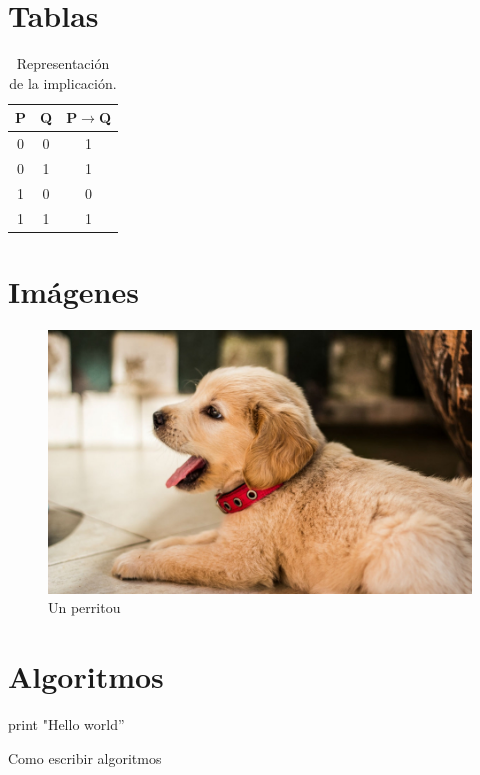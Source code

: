 \documentclass[11pt]{article} %
\begin{document}
\section{Tablas}

\begin{table}[H]
  \centering
  \begin{tabular}{| c | c || c|}
    \hline
    P & Q  & P$\rightarrow$Q \\ \hline
    0 & 0 & 1 \\ \hline
    0 & 1 & 1 \\ \hline          
    1 & 0 & 0 \\ \hline
    1 & 1 & 1 \\ \hline
  \end{tabular}
  \caption{Representación de la implicación.}
  \label{tabla:implicación}
\end{table}

\section{Imágenes}

\begin{figure}[H] %
  \begin{center}
    \includegraphics[width=450pt]{./perrito.jpg}
    \caption{Un perritou \smiley}
  \end{center}
\end{figure}

\section{Algoritmos \smiley}
\begin{algorithm}[H]
  print "Hello world''\;
  \caption{Como escribir algoritmos}
\end{algorithm}
\end{document}

